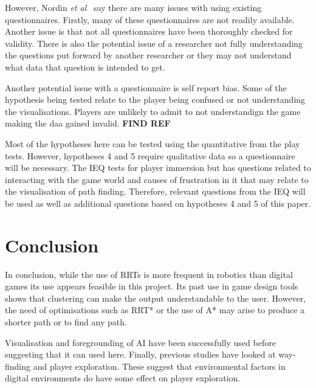 \documentclass[journal]{IEEEtran}
\begin{document}
However, Nordin \textit{et al}~\cite{nordin2014} say there are many issues with using existing questionnaires. Firstly, many of these questionnaires are not readily available. Another issue is that not all questionnaires have been thoroughly checked for validity. There is also the potential issue of a researcher not fully understanding the questions put forward by another researcher or they may not understand what data that question is intended to get.

Another potential issue with a questionnaire is self report bias. Some of the hypothesis being tested relate to the player being confused or not understanding the visualisations. Players are unlikely to admit to not understandign the game making the daa gained invalid. \textbf{FIND REF}

Most of the hypotheses here can be tested using the quantitative from the play tests. However, hypotheses 4 and 5 require qualitative data so a questionnaire will be necessary. The IEQ tests for player immersion but has questions related to interacting with the game world and causes of frustration in it that may relate to the visualisation of path finding.  Therefore, relevant questions from the IEQ will be used as well as additional questions based on hypotheses 4 and 5 of this paper.


\section{Conclusion}
In conclusion, while the use of RRTs is more frequent in robotics than digital games its use appears feasible in this project. Its past use in game design tools shows that clustering can make the output understandable to the user. However, the need of optimisations such as RRT* or the use of A* may arise to produce a shorter path or to find any path. 

Visualisation and foregrounding of AI have been successfully used before suggesting that it can used here. Finally, previous studies have looked at way-finding and player exploration. These suggest that environmental factors in digital environments do have some effect on player exploration.






\end{document}
